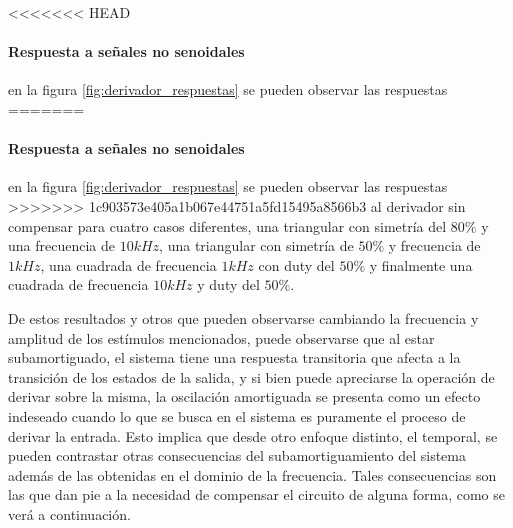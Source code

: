 <<<<<<< HEAD
\paragraph*{Respuesta a se\~nales no senoidales} en la figura \ref{fig:derivador_respuestas} se pueden observar las respuestas
=======
\paragraph*{Respuesta a señales no senoidales} en la figura \ref{fig:derivador_respuestas} se pueden observar las respuestas
>>>>>>> 1c903573e405a1b067e44751a5fd15495a8566b3
al derivador sin compensar para cuatro casos diferentes, una triangular con simetr\'ia del $80\%$ y una frecuencia de $10kHz$,
una triangular con simetr\'ia de $50\%$ y frecuencia de $1kHz$, una cuadrada de frecuencia $1kHz$ con duty del $50\%$ y finalmente una cuadrada
de frecuencia $10kHz$ y duty del $50\%$.

De estos resultados y otros que pueden observarse cambiando la frecuencia y amplitud de los est\'imulos mencionados, puede observarse que al estar subamortiguado,
el sistema tiene una respuesta transitoria que afecta a la transici\'on de los estados de la salida, y si bien puede apreciarse la operaci\'on de derivar sobre la misma,
la oscilaci\'on amortiguada se presenta como un efecto indeseado cuando lo que se busca en el sistema es puramente el proceso de derivar la entrada. Esto implica que desde otro enfoque distinto,
el temporal, se pueden contrastar otras consecuencias del subamortiguamiento del sistema adem\'as de las obtenidas en el dominio de la frecuencia. Tales consecuencias son las que dan pie a la necesidad
de compensar el circuito de alguna forma, como se ver\'a a continuaci\'on.

